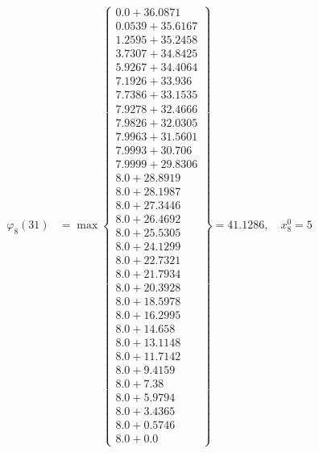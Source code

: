 \documentclass{article}
\begin{document}
\begin{align*}
  
\varphi_{8}(31) &= \max \left\{ \begin{array}{c}
0.0 + 36.0871 \\
 0.0539 + 35.6167 \\
 1.2595 + 35.2458 \\
 3.7307 + 34.8425 \\
 5.9267 + 34.4064 \\
 7.1926 + 33.936 \\
 7.7386 + 33.1535 \\
 7.9278 + 32.4666 \\
 7.9826 + 32.0305 \\
 7.9963 + 31.5601 \\
 7.9993 + 30.706 \\
 7.9999 + 29.8306 \\
 8.0 + 28.8919 \\
 8.0 + 28.1987 \\
 8.0 + 27.3446 \\
 8.0 + 26.4692 \\
 8.0 + 25.5305 \\
 8.0 + 24.1299 \\
 8.0 + 22.7321 \\
 8.0 + 21.7934 \\
 8.0 + 20.3928 \\
 8.0 + 18.5978 \\
 8.0 + 16.2995 \\
 8.0 + 14.658 \\
 8.0 + 13.1148 \\
 8.0 + 11.7142 \\
 8.0 + 9.4159 \\
 8.0 + 7.38 \\
 8.0 + 5.9794 \\
 8.0 + 3.4365 \\
 8.0 + 0.5746 \\
 8.0 + 0.0
\end{array} \right\}=41.1286,\quad x_{8}^0=5\\
  
  
  

\end{align*}
\end{document}
